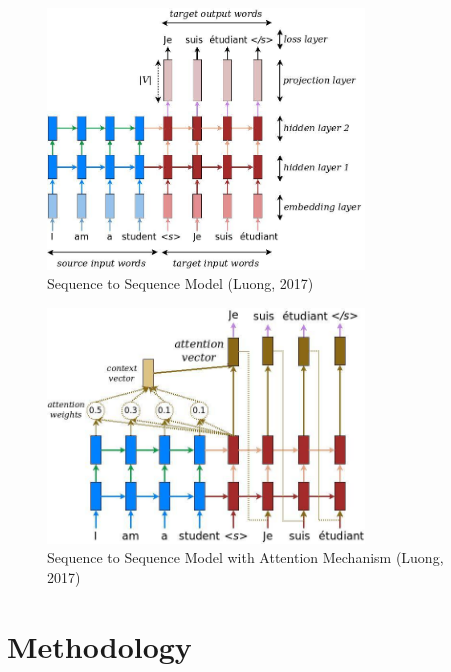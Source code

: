 \documentclass[10pt,a4paper]{article}
\begin{document}
\clearpage

\begin{figure}[H]
  \begin{center}
    \includegraphics[width=0.75\textwidth]{seq2seq.jpg}
    \caption{Sequence to Sequence Model (Luong, 2017)}
  \end{center}
\end{figure}

\begin{figure}[H]
  \begin{center}
    \includegraphics[width=0.75\textwidth] {attention_mechanism.jpg}
    \caption{Sequence to Sequence Model with Attention Mechanism (Luong, 2017)}
  \end{center}
\end{figure}

\clearpage

\section{Methodology}
\end{document}
